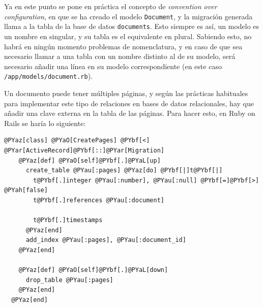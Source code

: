 %

Ya en este punto se pone en práctica el concepto de \emph{convention over configuration}, en que se ha creado el modelo \texttt{Document}, y la migración generada llama a la tabla de la base de datos \texttt{documents}. Esto siempre es así, un modelo es un nombre en singular, y su tabla es el equivalente en plural. Sabiendo esto, no habrá en ningún momento problemas de nomenclatura, y en caso de que sea necesario llamar a una tabla con un nombre distinto al de su modelo, será necesario añadir una línea en su modelo correspondiente (en este caso \texttt{/app/models/document.rb}).

Un documento puede tener múltiples páginas, y según las prácticas habituales para implementar este tipo de relaciones en bases de datos relacionales, hay que añadir una clave externa en la tabla de las páginas. Para hacer esto, en Ruby on Rails se haría lo siguiente:

\begin{Verbatim}[commandchars=@\[\]]
  @PYaz[class] @PYaO[CreatePages] @PYbf[<] @PYar[ActiveRecord]@PYbf[::]@PYar[Migration]
    @PYaz[def] @PYaO[self]@PYbf[.]@PYaL[up]
      create_table @PYau[:pages] @PYaz[do] @PYbf[|]t@PYbf[|]
        t@PYbf[.]integer @PYau[:number], @PYau[:null] @PYbf[=]@PYbf[>] @PYah[false]
        t@PYbf[.]references @PYau[:document]
        
        t@PYbf[.]timestamps
      @PYaz[end]
      add_index @PYau[:pages], @PYau[:document_id]
    @PYaz[end]

    @PYaz[def] @PYaO[self]@PYbf[.]@PYaL[down]
      drop_table @PYau[:pages]
    @PYaz[end]
  @PYaz[end]
\end{Verbatim}

%        
%

